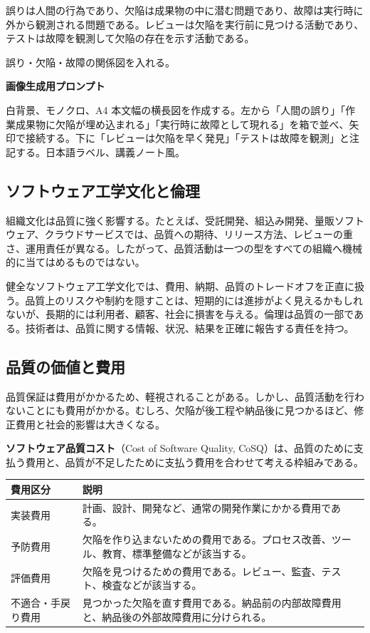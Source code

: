 \documentclass[11pt,a4paper]{article}
\newcommand{\term}[2]{\textbf{#1}（#2）}
\begin{document}
\begin{notebox}
誤りは人間の行為であり、欠陥は成果物の中に潜む問題であり、故障は実行時に外から観測される問題である。レビューは欠陥を実行前に見つける活動であり、テストは故障を観測して欠陥の存在を示す活動である。
\end{notebox}

\begin{todobox}
誤り・欠陥・故障の関係図を入れる。\par
\textbf{画像生成用プロンプト}\par
白背景、モノクロ、A4 本文幅の横長図を作成する。左から「人間の誤り」「作業成果物に欠陥が埋め込まれる」「実行時に故障として現れる」を箱で並べ、矢印で接続する。下に「レビューは欠陥を早く発見」「テストは故障を観測」と注記する。日本語ラベル、講義ノート風。
\end{todobox}

\subsection{ソフトウェア工学文化と倫理}
組織文化は品質に強く影響する。たとえば、受託開発、組込み開発、量販ソフトウェア、クラウドサービスでは、品質への期待、リリース方法、レビューの重さ、運用責任が異なる。したがって、品質活動は一つの型をすべての組織へ機械的に当てはめるものではない。

健全なソフトウェア工学文化では、費用、納期、品質のトレードオフを正直に扱う。品質上のリスクや制約を隠すことは、短期的には進捗がよく見えるかもしれないが、長期的には利用者、顧客、社会に損害を与える。倫理は品質の一部である。技術者は、品質に関する情報、状況、結果を正確に報告する責任を持つ。

\subsection{品質の価値と費用}
品質保証は費用がかかるため、軽視されることがある。しかし、品質活動を行わないことにも費用がかかる。むしろ、欠陥が後工程や納品後に見つかるほど、修正費用と社会的影響は大きくなる。

\term{ソフトウェア品質コスト}{Cost of Software Quality, CoSQ}は、品質のために支払う費用と、品質が不足したために支払う費用を合わせて考える枠組みである。


\noindent\begin{tabularx}{\textwidth}{L{0.24\textwidth}Y}
\toprule
\textbf{費用区分} & \textbf{説明} \\
\midrule
実装費用 & 計画、設計、開発など、通常の開発作業にかかる費用である。 \\
予防費用 & 欠陥を作り込まないための費用である。プロセス改善、ツール、教育、標準整備などが該当する。 \\
評価費用 & 欠陥を見つけるための費用である。レビュー、監査、テスト、検査などが該当する。 \\
不適合・手戻り費用 & 見つかった欠陥を直す費用である。納品前の内部故障費用と、納品後の外部故障費用に分けられる。 \\
\bottomrule
\end{tabularx}
\end{document}
